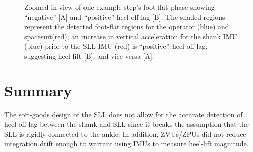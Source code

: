 \documentclass[defaultstyle,11pt]{comps}
\begin{document}
\begin{figure}
\centering


\caption{Zoomed-in view of one example step's foot-flat phase showing ``negative'' {[}A{]} and ``positive'' heel-off lag {[}B{]}. The shaded regions represent the detected foot-flat regions for the operator (blue) and spacesuit(red); an increase in vertical acceleration for the shank IMU (blue) prior to the SLL IMU (red) is ``positive'' heel-off lag, suggesting heel-lift {[}B{]}, and vice-versa {[}A{]}.}

\label{fig:alllag}

\end{figure}

\hypertarget{summary-2}{%
\section{Summary}\label{summary-2}}

The soft-goods design of the SLL does not allow for the accurate detection of heel-off lag between the shank and SLL since it breaks the assumption that the SLL is rigidly connected to the ankle.
In addition, ZVUs/ZPUs did not reduce integration drift enough to warrant using IMUs to measure heel-lift magnitude.
\end{document}

